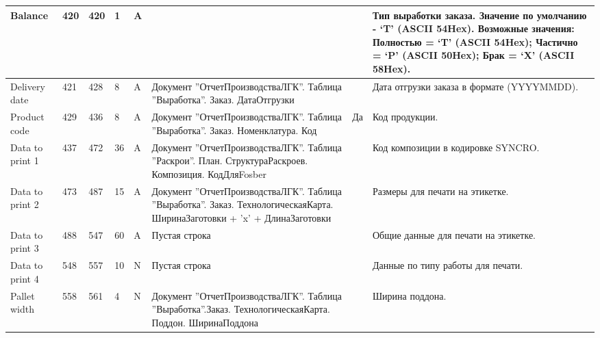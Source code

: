\begin{landscape}
\begin{longtable}{|p{25mm}|p{6mm}|p{6mm}|p{8mm}|p{6mm}|p{60mm}|p{12mm}|p{100mm}|}
\hline
\parbox[c][22mm]{25mm}{Balance} & \parbox{10mm}{420} & \parbox{10mm}{420} & \parbox{10mm}{1} & \parbox{10mm}{A} & \parbox{49mm}{} & \parbox{11mm}{} & \parbox{89mm}{Тип выработки заказа. Значение по умолчанию - ‘T’ (ASCII 54Hex). Возможные значения:
Полностью = ‘T’ (ASCII 54Hex);
Частично = ‘P’ (ASCII 50Hex);
Брак = ‘X’ (ASCII 58Hex).} \\
\hline
\parbox[c][20mm]{25mm}{Delivery date} & \parbox{10mm}{421} & \parbox{10mm}{428} & \parbox{10mm}{8} & \parbox{10mm}{A} & \parbox{49mm}{Документ ''ОтчетПроизводстваЛГК''. Таблица ''Выработка''. Заказ. ДатаОтгрузки} & \parbox{11mm}{} & \parbox{89mm}{Дата отгрузки заказа в формате (YYYYMMDD).} \\
\hline
\parbox[c][20mm]{25mm}{Product code} & \parbox{10mm}{429} & \parbox{10mm}{436} & \parbox{10mm}{8} & \parbox{10mm}{A} & \parbox{49mm}{Документ ''ОтчетПроизводстваЛГК''. Таблица ''Выработка''. Заказ. Номенклатура. Код} & \parbox{11mm}{Да} & \parbox{89mm}{Код продукции.} \\
\hline
\parbox[c][20mm]{25mm}{Data to print 1} & \parbox{10mm}{437} & \parbox{10mm}{472} & \parbox{10mm}{36} & \parbox{10mm}{A} & \parbox{49mm}{Документ ''ОтчетПроизводстваЛГК''. Таблица ''Раскрои''. План. СтруктураРаскроев. Композиция. КодДляFosber} & \parbox{11mm}{} & \parbox{89mm}{Код композиции в кодировке SYNCRO.} \\
\hline
\parbox[c][22mm]{25mm}{Data to print 2} & \parbox{10mm}{473} & \parbox{10mm}{487} & \parbox{10mm}{15} & \parbox{10mm}{A} & \parbox{49mm}{Документ ''ОтчетПроизводстваЛГК''. Таблица ''Выработка''. Заказ. ТехнологическаяКарта. ШиринаЗаготовки + 'x' + ДлинаЗаготовки} & \parbox{11mm}{} & \parbox{89mm}{Размеры для печати на этикетке.} \\
\hline
\parbox[c][5mm]{25mm}{Data to print 3} & \parbox{10mm}{488} & \parbox{10mm}{547} & \parbox{10mm}{60} & \parbox{10mm}{A} & \parbox{49mm}{Пустая строка} & \parbox{11mm}{} & \parbox{89mm}{Общие данные для печати на этикетке.} \\
\hline
\parbox[c][9mm]{25mm}{Data to print 4} & \parbox{10mm}{548} & \parbox{10mm}{557} & \parbox{10mm}{10} & \parbox{10mm}{N} & \parbox{49mm}{Пустая строка} & \parbox{11mm}{} & \parbox{89mm}{Данные по типу работы для печати.} \\*
\hline
\parbox[c][22mm]{25mm}{Pallet width} & \parbox{10mm}{558} & \parbox{10mm}{561} & \parbox{10mm}{4} & \parbox{10mm}{N} & \parbox{49mm}{Документ ''ОтчетПроизводстваЛГК''. Таблица ''Выработка''.Заказ. ТехнологическаяКарта. Поддон. ШиринаПоддона} & \parbox{11mm}{} & \parbox{89mm}{Ширина поддона.} \\

\end{longtable}
\end{landscape}
